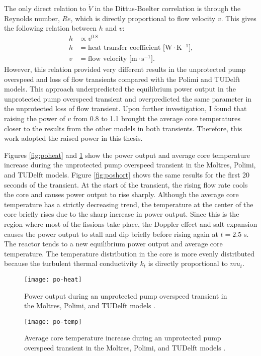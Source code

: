 %
The only direct relation to $\dot{V}$ in the Dittus-Boelter correlation is
through the Reynolds number, $Re$, which is directly proportional to
flow velocity $v$. This gives the following relation between $h$ and $v$:
%
\begin{align}
    h &\propto v^{0.8} \label{eq:hv} \\
    h &= \text{heat transfer coefficient [W$\cdot$K$^{-1}$],} \nonumber \\
    v &= \text{flow velocity [m$\cdot$s$^{-1}$].} \nonumber
\end{align}
%
However, this relation provided very different results in the unprotected pump
overspeed and loss of flow transients compared with the Polimi and TUDelft
models. This approach underpredicted the equilibrium power output in the
unprotected pump overspeed transient and overpredicted the same parameter in
the unprotected loss of flow transient. Upon further investigation, I
found that raising the power of $v$ from 0.8 to 1.1 brought the
average core temperatures closer to the results from the other models in both
transients. Therefore, this work adopted the raised power in this thesis.

Figures \ref{fig:poheat} and
\ref{fig:potemp} show the power output and average core temperature increase
during the unprotected pump overspeed transient in the Moltres, Polimi, and
TUDelft models. Figure \ref{fig:poshort} shows the same results for the first
20 seconds of the transient. At the start of the transient, the rising flow
rate cools the core and causes power output to rise sharply. Although the
average core temperature has a strictly decreasing trend, the temperature at
the center of the core briefly rises due to the sharp increase in power
output. Since this is the region where most of the fissions take place, the
Doppler effect and salt expansion causes the power output to stall and dip
briefly before rising again at $t=2.5$ s. The reactor tends to a new
equilibrium power output and average core temperature. The temperature
distribution in the core is more evenly distributed because the turbulent
thermal conductivity $k_t$ is directly proportional to $mu_t$.

\begin{figure}[htbp!]
    \centering
    \texttt{[image: po-heat]}
    \caption{Power output during
    an unprotected pump overspeed transient in the Moltres, Polimi, and
    TUDelft models \cite{fiorina_modelling_2014}.}
    \label{fig:poheat}
    \texttt{[image: po-temp]}
    \caption{Average core temperature increase during
    an unprotected pump overspeed transient in the Moltres, Polimi, and
    TUDelft models \cite{fiorina_modelling_2014}.}
    \label{fig:potemp}
\end{figure}

